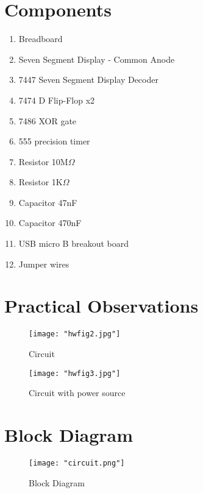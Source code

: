 \documentclass{article}
\begin{document}
 

\section*{Components}
\begin{enumerate}
    \item Breadboard
    \item Seven Segment Display - Common Anode
    \item 7447 Seven Segment Display Decoder
    \item 7474 D Flip-Flop x2
    \item 7486 XOR gate
    \item 555 precision timer
    \item Resistor 10M$\Omega$
    \item Resistor 1K$\Omega$
    \item Capacitor 47nF
    \item Capacitor 470nF
    \item USB micro B breakout board
    \item Jumper wires
\end{enumerate}

\section*{Practical Observations}
\begin{figure}[ht]
	\centering
	\texttt{[image: "hwfig2.jpg"]}
	\caption{Circuit}
	\label{fig:view}
\end{figure}
\FloatBarrier

\begin{figure}[ht]
	\centering
	\texttt{[image: "hwfig3.jpg"]}
	\caption{Circuit with power source}
	\label{fig:view}
\end{figure}
\FloatBarrier

\FloatBarrier

\section*{Block Diagram}

\begin{figure}[ht]
	\centering
	\texttt{[image: "circuit.png"]}
	\caption{Block Diagram}
	\label{fig:view}
\end{figure}
\FloatBarrier
\end{document}
